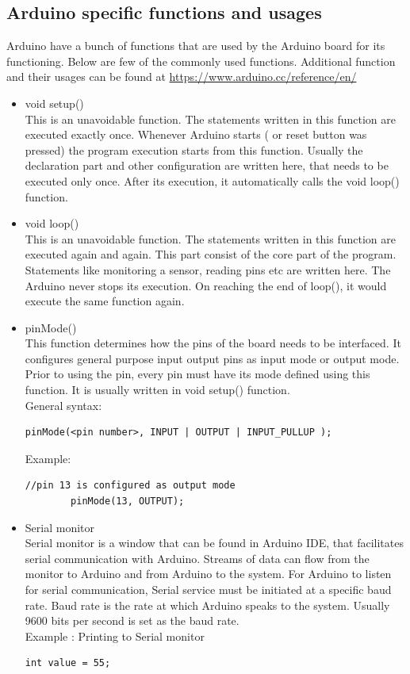 \subsection{Arduino specific functions and usages}
\par Arduino have a bunch of functions that are used by the Arduino board for its functioning. Below are few of the commonly used functions. Additional function and their usages can be found at \url{https://www.arduino.cc/reference/en/}\\

\begin{itemize}
    \item void setup()\\
    This is an unavoidable function. The statements written in this function are executed exactly once. Whenever Arduino starts ( or reset button was pressed) the program execution starts from this function. Usually the declaration part and other configuration are written here, that needs to be executed only once. After its execution, it automatically calls the void loop() function.
    
    \item void loop()\\
    This is an unavoidable function. The statements written in this function are executed again and again. This part consist of the core part of the program. Statements like monitoring a sensor, reading pins etc are written here. The Arduino never stops its execution. On reaching the end of loop(), it would execute the same function again.
    
    \item pinMode() \\
    This function determines how the pins of the board needs to be interfaced. It configures general purpose input output pins as input mode or output mode. Prior to using the pin, every pin must have its mode defined using this function. It is usually written in void setup() function.\\
    General syntax:
    \begin{lstlisting}[style=CStyle]
        pinMode(<pin number>, INPUT | OUTPUT | INPUT_PULLUP );
    \end{lstlisting}
    Example:
    \begin{lstlisting}[style=CStyle]
        //pin 13 is configured as output mode
        pinMode(13, OUTPUT);  
    \end{lstlisting}
    
    \item Serial monitor\\
    Serial monitor is a window that can be found in Arduino \ac{IDE}, that facilitates serial communication with Arduino. Streams of data can flow from the monitor to Arduino and from Arduino to the system. For Arduino to listen for serial communication, Serial service must be initiated at a specific baud rate. Baud rate is the rate at which Arduino speaks to the system. Usually 9600 bits per second is set as the baud rate.\\ 
    Example : Printing to Serial monitor
    \begin{lstlisting}[style=CStyle]
    int value = 55;
    

\end{lstlisting}
\end{itemize}
